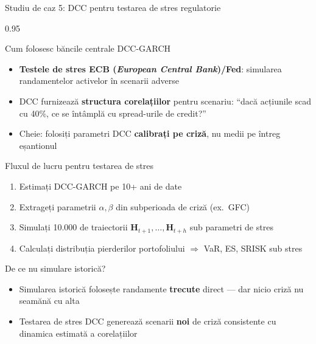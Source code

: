 \documentclass[9pt, aspectratio=169, t]{beamer}
\begin{document}
\begin{frame}{Studiu de caz 5: DCC pentru testarea de stres regulatorie}
    \begin{cminipage}{0.95\textwidth}
    \vspace{-2mm}
    {\footnotesize
    \begin{block}{Cum folosesc băncile centrale DCC-GARCH}
        \begin{itemize}\setlength{\itemsep}{1pt}
            \item \textbf{Testele de stres ECB (\textit{European Central Bank})/Fed}: simularea randamentelor activelor în scenarii adverse
            \item DCC furnizează \textbf{structura corelațiilor} pentru scenariu: ``dacă acțiunile scad cu 40\%, ce se întâmplă cu spread-urile de credit?''
            \item Cheie: folosiți parametri DCC \textbf{calibrați pe criză}, nu medii pe întreg eșantionul
        \end{itemize}
    \end{block}
    \vspace{-2mm}
    \begin{block}{Fluxul de lucru pentru testarea de stres}
        \begin{enumerate}\setlength{\itemsep}{0pt}
            \item Estimați DCC-GARCH pe 10+ ani de date
            \item Extrageți parametrii $\alpha, \beta$ din subperioada de criză (ex.\ GFC)
            \item Simulați 10.000 de traiectorii $\mathbf{H}_{t+1}, \ldots, \mathbf{H}_{t+h}$ sub parametri de stres
            \item Calculați distribuția pierderilor portofoliului $\Rightarrow$ VaR, ES, SRISK sub stres
        \end{enumerate}
    \end{block}
    \vspace{-2mm}
    \begin{alertblock}{De ce nu simulare istorică?}
        \begin{itemize}\setlength{\itemsep}{0pt}
            \item Simularea istorică folosește randamente \textbf{trecute} direct --- dar nicio criză nu seamănă cu alta
            \item Testarea de stres DCC generează scenarii \textbf{noi} de criză consistente cu dinamica estimată a corelațiilor
        \end{itemize}
    \end{alertblock}
    }
    \end{cminipage}
\end{frame}
\end{document}
